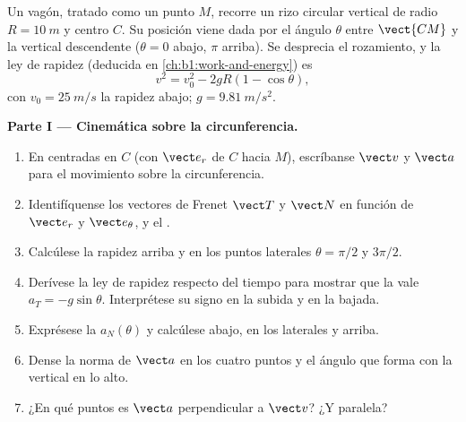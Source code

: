 \begin{problem}
\label{pb:b1:point-kinematics:1}
Un vagón, tratado como un punto $M$, recorre un rizo circular vertical de
radio $R = \qty{10}{m}$ y centro $C$. Su posición viene dada por el ángulo
$\theta$ entre $\vect{CM}$ y la vertical descendente ($\theta =
0$ abajo, $\pi$ arriba). Se desprecia el rozamiento, y la ley de rapidez
(deducida en \cref{ch:b1:work-and-energy}) es
\[
v^2 = v_0^2 - 2gR(1 - \cos\theta),
\]
con $v_0 = \qty{25}{m/s}$ la rapidez abajo; $g = \qty{9.81}{m/s^2}$.

\medskip
\noindent\textbf{Parte I --- Cinemática sobre la circunferencia.}
\begin{enumerate}
  \item En  centradas en $C$ (con $\vect e_r$ de $C$
        hacia $M$), escríbanse $\vect v$ y $\vect a$ para el movimiento
        sobre la circunferencia.
  \item Identifíquense los vectores de Frenet $\vect T$ y $\vect N$ en
        función de $\vect e_r$ y $\vect e_\theta$, y el .
  \item Calcúlese la rapidez arriba y en los puntos laterales
        $\theta = \pi/2$ y $3\pi/2$.
  \item Derívese la ley de rapidez respecto del tiempo para mostrar que la
         vale $a_T = -g\sin\theta$. Interprétese su
        signo en la subida y en la bajada.
  \item Exprésese la  $a_N(\theta)$ y calcúlese abajo,
        en los laterales y arriba.
  \item Dense la norma de $\vect a$ en los cuatro puntos y el ángulo que
        forma con la vertical en lo alto.
  \item ¿En qué puntos es $\vect a$ perpendicular a $\vect v$? ¿Y paralela?
\end{enumerate}


\end{problem}
